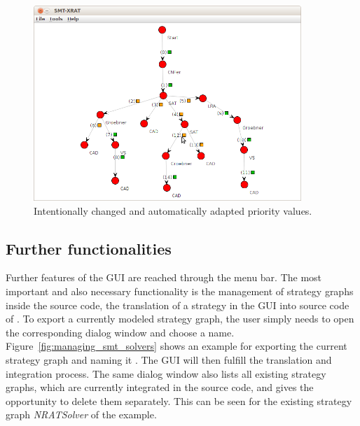 \begin{figure}[ht]
  \begin{center}
    \includegraphics[width=0.9\textwidth]{graphics/smt-xrat_priority_b.png}
  \end{center}
  \caption{Intentionally changed and automatically adapted priority values.}
  \label{fig:smt-xrat_priority_b}
\end{figure}

\subsection{Further functionalities}
\label{sec:further_functionalities}
Further features of the GUI are reached through the menu bar. The most important
and also necessary functionality is the management of strategy graphs inside
the \smtrat source code, \eg the translation of a strategy in the GUI into source code
of \smtrat. To export a currently modeled strategy graph, the user simply needs 
to open the corresponding dialog window and choose a name. Figure~\ref{fig:managing_smt_solvers}
shows an example for exporting the current strategy graph and naming it 
\smtxrat. The GUI will then fulfill the translation and integration process. 
The same dialog window also lists all existing strategy graphs, which are currently 
integrated in the source code, and gives the opportunity to delete them separately.
This can be seen for the existing strategy graph \emph{NRATSolver} of the example.

